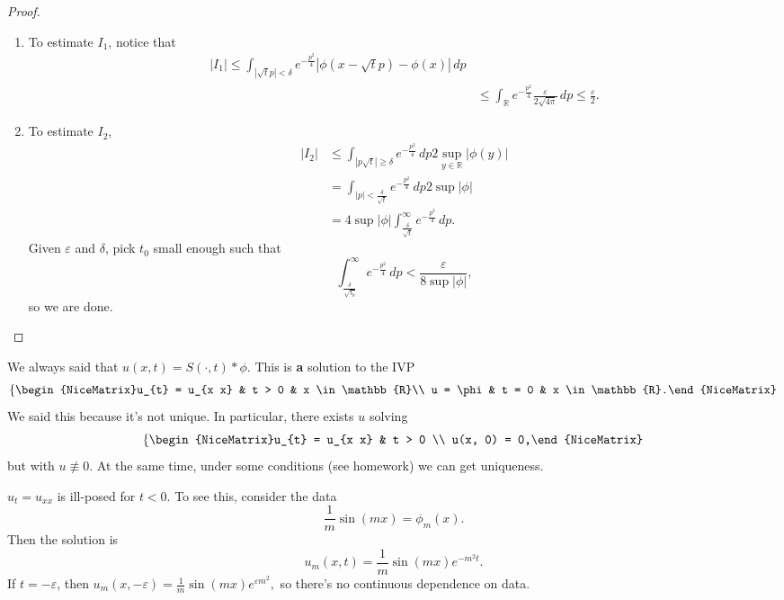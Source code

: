 \begin{proof}
\begin{enumerate}
\begin{enumerate}
					\item To estimate \( I_{1} \), notice that
						\begin{align*}
							|I_{1}| \le \int_{|\sqrt{t} p| < \delta} e^{- \frac{p^{2}}{4}} | \phi(x - \sqrt{t}p) - \phi(x)| \, dp \\
							&\le \int_{\mathbb{R}} e^{- \frac{p^{2}}{4}} \frac{\varepsilon}{2 \sqrt{4 \pi}} \, dp \le \frac{\varepsilon}{2}.
						\end{align*}
					\item To estimate \( I_{2} \),
						\begin{align*}
							|I_{2}| &\le \int_{|p \sqrt{t}| \ge \delta} e^{- \frac{p^{2}}{4}} \, dp 2 \sup_{y \in \mathbb{R}} | \phi(y)| \\
											&= \int_{|p| < \frac{\delta}{\sqrt{t}}} e^{- \frac{p^{2}}{4}}\, dp 2 \sup | \phi| \\
											&= 4 \sup | \phi| \int_{\frac{\delta}{\sqrt{t}}}^{\infty} e^{- \frac{p^{2}}{4}}\, dp. 
						\end{align*}
						Given \( \varepsilon \) and \( \delta \), pick \( t_{0} \) small enough such that
						\[ \int_{\frac{\delta}{\sqrt{t_{0}}}}^{\infty} e^{- \frac{p^{2}}{4}}\, dp < \frac{\varepsilon}{8 \sup | \phi|}, \]
						so we are done.
				\end{enumerate}
	\end{enumerate}
\end{proof}

\begin{remark}
	We always said that \( u(x, t) = S(\cdot, t) * \phi \). This is \textbf{a} solution to the IVP
	\[ \left\{\begin{NiceMatrix}u_{t} = u_{x x} & t > 0 & x \in \mathbb{R}\\ u = \phi & t = 0 & x \in \mathbb{R}.\end{NiceMatrix}\right.  \]
	We said this because it's not unique. In particular, there exists \( u \) solving
	\[ \left\{\begin{NiceMatrix}u_{t} = u_{x x} & t > 0 \\ u(x, 0) = 0,\end{NiceMatrix}\right.  \]
	but with \( u \not \equiv 0 \). At the same time, under some conditions (see homework) we can get uniqueness.
\end{remark}

\begin{remark}
	\( u_{t} = u_{x x} \) is ill-posed for \( t < 0 \). To see this, consider the data
	\[ \frac{1}{m} \sin(m x) = \phi_{m}(x). \]
	Then the solution is
	\[ u_{m}(x, t) = \frac{1}{m} \sin(mx) e^{- m^{2} t}. \]
	If \( t = - \varepsilon \), then \( u_{m}(x, - \varepsilon) = \frac{1}{m}\sin(mx) e^{\varepsilon m^{2}}, \)
	so there's no continuous dependence on data.
\end{remark}

